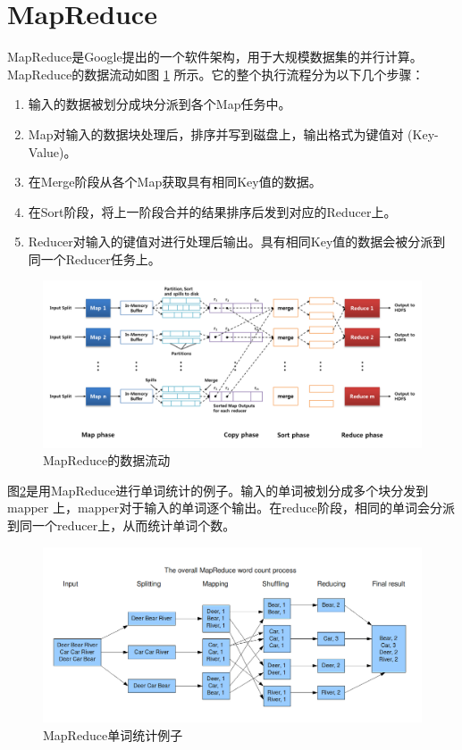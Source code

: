 \section{MapReduce}

MapReduce是Google提出的一个软件架构，用于大规模数据集的并行计算。MapReduce的数据流动如图 \ref{mr_data_flow} 所示。它的整个执行流程分为以下几个步骤：

\begin{enumerate}
\item 输入的数据被划分成块分派到各个Map任务中。
\item Map对输入的数据块处理后，排序并写到磁盘上，输出格式为键值对 (Key-Value)。
\item 在Merge阶段从各个Map获取具有相同Key值的数据。
\item 在Sort阶段，将上一阶段合并的结果排序后发到对应的Reducer上。
\item Reducer对输入的键值对进行处理后输出。具有相同Key值的数据会被分派到同一个Reducer任务上。
\end{enumerate}

\begin{figure}[h]
\centering\includegraphics[width=6in]{picture/ch_preliminary/mr_data_flow} 
\caption{MapReduce的数据流动}\label{mr_data_flow} 
\end{figure} 

图\ref{mr_word_count}是用MapReduce进行单词统计的例子。输入的单词被划分成多个块分发到 mapper 上，mapper对于输入的单词逐个输出。在reduce阶段，相同的单词会分派到同一个reducer上，从而统计单词个数。

\begin{figure}[!ht]
\centering\includegraphics[width=6in]{picture/ch_preliminary/mr_word_count} 
\caption{MapReduce单词统计例子}\label{mr_word_count} 
\end{figure} 



